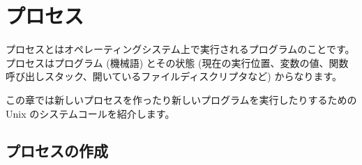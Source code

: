 %
%

\chapter{\label{sec/processes}プロセス}

プロセスとはオペレーティングシステム上で実行されるプログラムのことです。プロセスはプログラム (機械語) とその状態 (現在の実行位置、変数の値、関数呼び出しスタック、開いているファイルディスクリプタなど) からなります。

この章では新しいプロセスを作ったり新しいプログラムを実行したりするための Unix のシステムコールを紹介します。

\section{プロセスの作成}

